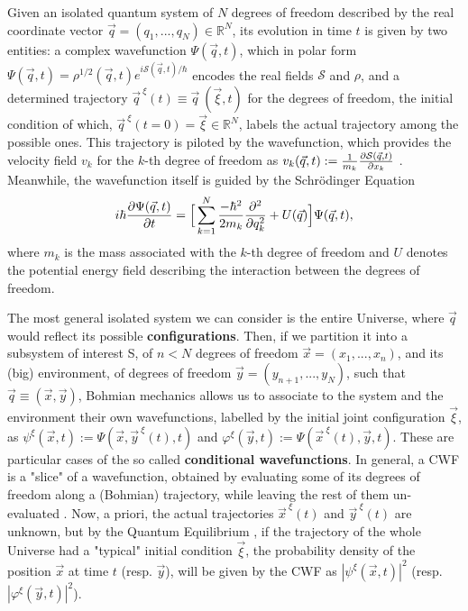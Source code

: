 \documentclass[11pt, a4paper]{article} %
\newcommand{\R}{\mathbb{R}} %
\begin{document}
Given an isolated quantum system of $N$ degrees of freedom described by the real coordinate vector $\vec{q}=(q_1,..., q_N)\in\R^N$, its evolution in time $t$ is given by two entities: a complex wavefunction $\Psi(\vec{q},t)$, which in polar form $\Psi(\vec{q},t)=\rho^{1/2}(\vec{q},t)e^{i\mathcal{S}(\vec{q},t)/\hbar}$ encodes the real fields $\mathcal{S}$ and $\rho$, and a determined trajectory $\vec{q}^{\:\xi}(t)\equiv \vec{q}\:(\vec{\xi},t)$ for the degrees of freedom, the initial condition of which, $\vec{q}^{\:\xi}(t=0)=\vec{\xi}\in \R^N$, labels the actual trajectory among the possible ones. This trajectory is piloted by the wavefunction, which provides the velocity field $v_k$ for the $k$-th degree of freedom as $v_k(\vec{q},t):=\frac{1}{m_k} \pdv{\mathcal{S}(\vec{q},t)}{x_k}$ \cite{Bohm,Holland,Durr,JordiXavier}. Meanwhile, the wavefunction itself is guided by the Schrödinger Equation\vspace{-0.1cm} 
\begin{equation}\label{SE}
i\hbar\pdv{\Psi(\vec{q},t)}{t}=\Big[ \sum_{k=1}^N \frac{-\hbar^2}{2m_k}\pdv[2]{}{q_k}+U(\vec{q})\Big]\Psi(\vec{q},t),\vspace{-0.1cm}
\end{equation}
where $m_k$ is the mass associated with the $k$-th degree of freedom and $U$ denotes the potential energy field describing the interaction between the degrees of freedom. 

The most general isolated system we can consider is the entire Universe, where $\vec{q}$ would reflect its possible {\bf configurations}. Then, if we partition it into a subsystem of interest S, of $n<N$ degrees of freedom $\vec{x}=(x_1,...,x_n)$, and its (big) environment, of degrees of freedom $\vec{y}=(y_{n+1},...,y_N)$, such that $\vec{q}\equiv (\vec{x},\vec{y})$, Bohmian mechanics allows us to associate to the system and the environment their own wavefunctions, labelled by the initial joint configuration $\vec{\xi}$, as $\psi^\xi(\vec{x},t):=\Psi(\vec{x},\vec{y}^{\:\xi}(t),t)$ and $\varphi^\xi(\vec{y},t):=\Psi(\vec{x}^{\:\xi}(t),\vec{y},t)$. These are particular cases of the so called {\bf conditional wavefunctions}. In general, a CWF is a "slice" of a wavefunction, obtained by evaluating some of its degrees of freedom along a (Bohmian) trajectory, while leaving the rest of them un-evaluated \cite{Absolute, JordiXavier}. Now, a priori, the actual trajectories $\vec{x}^{\:\xi}(t)$ and $\vec{y}^{\:\xi}(t)$ are unknown, but by the Quantum Equilibrium \cite{Absolute}, if the trajectory of the whole Universe had a "typical" initial condition $\vec{\xi}$, the probability density of the position $\vec{x}$ at time $t$ (resp. $\vec{y}$), will be given by the CWF as $|\psi^\xi(\vec{x},t)|^2$ (resp. $|\varphi^\xi(\vec{y},t)|^2$).
\end{document}

